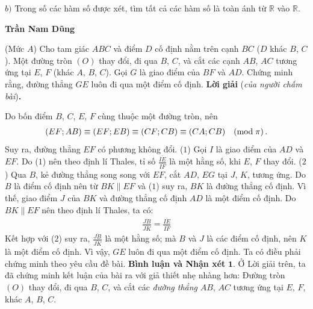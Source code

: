 \begin{multicols}{2}
	\vskip 0.05cm
	$b)$ Trong số các hàm số được xét, tìm tất cả các hàm số là toàn ánh từ $\mathbb{R}$  vào  $\mathbb{R}$.
	\begin{flushright}
		\textbf{\color{thachthuctoanhoc}Trần Nam Dũng}
	\end{flushright}
	{}
	(Mức $A$)
	Cho tam giác $ABC$ và điểm $D$ cố định nằm trên cạnh $BC$ ($D$ khác $B$, $C$). Một đường tròn $(O)$ thay đổi, đi qua $B$, $C$, và cắt các cạnh $AB$, $AC$ tương ứng tại $E$, $F$ (khác $A$, $B$, $C$). Gọi $G$ là giao điểm của $BF$ và $AD$. Chứng minh rằng, đường thẳng $GE$ luôn đi qua một điểm cố định.
	\vskip 0.05cm
	\textbf{\color{thachthuctoanhoc}Lời giải} (\textit{của người chấm bài})\textbf{\color{thachthuctoanhoc}.}
	
	Do bốn điểm $B$, $C$, $E$, $F$ cùng thuộc một đường tròn, nên
	\begin{align*}
		\left( {EF;AB} \right) \equiv \left( {EF;EB} \right) \equiv \left( {CF;CB} \right) \equiv \left( {CA;CB} \right)\;\;\;\left( {{\rm{mod}}\;\pi } \right).
	\end{align*}
	Suy ra, đường thẳng $EF$ có phương không đổi.                    \hfill ($1$)
	\vskip 0.05cm
	Gọi $I$ là giao điểm của $AD$ và $EF$. Do ($1$) nên theo định lí Thales, tỉ số $\frac{{\overline {IE} }}{{\overline {IF} }}$ là một hằng số, khi $E$, $F$ thay đổi.                                                               \hfill ($2$)
	\vskip 0.05cm
	Qua $B$, kẻ đường thẳng song song với $EF$, cắt $AD$, $EG$ tại $J$, $K$, tương ứng.
	\vskip 0.05cm
	Do $B$ là điểm cố định nên từ $BK \parallel EF$ và ($1$) suy ra, $BK$ là đường thẳng cố định. Vì thế, giao điểm $J$ của $BK$ và đường thẳng cố định $AD$ là một điểm cố định.
	\vskip 0.05cm
	Do $BK \parallel EF$ nên theo định lí Thales, ta có:
	\begin{align*}
		\frac{{\overline {JB} }}{{\overline {JK} }} = \frac{{\overline {IE} }}{{\overline {IF} }}
	\end{align*}
	Kết hợp với ($2$) suy ra, $\frac{{\overline {JB} }}{{\overline {JK} }}$ là một hằng số; mà $B$ và $J$ là các điểm cố định, nên $K$ là một điểm cố định.
	\vskip 0.05cm
	Vì vậy, $GE$ luôn đi qua một điểm cố định. Ta có điều phải chứng minh theo yêu cầu đề bài.
	\vskip 0.05cm
	\textbf{\color{thachthuctoanhoc}Bình luận và Nhận xét}
	\vskip 0.05cm
	$\pmb{1.}$ Ở Lời giải trên, ta đã chứng minh kết luận của bài ra với giả thiết nhẹ nhàng hơn: Đường tròn $(O)$ thay đổi, đi qua $B$, $C$, và cắt các \textit{đường thẳng} $AB$, $AC$ tương ứng tại $E$, $F$, khác $A$, $B$, $C$.

\end{multicols}
